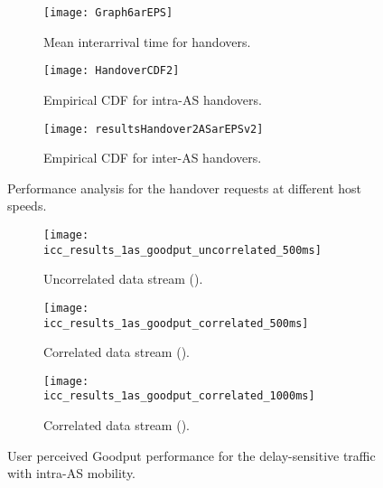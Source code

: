 \documentclass[conference]{IEEEtran}
\begin{document}
\begin{figure*}
        \centering
        \hspace{-0.1in}
        \begin{subfigure}[b]{0.3\textwidth}\centering
               \texttt{[image: Graph6arEPS]}\\
               \caption{Mean interarrival time for handovers.}
               \label{AverageHandoverDuration}
        \end{subfigure}
        \hspace{0.1in}
        \begin{subfigure}[b]{0.3\textwidth}\centering
                \texttt{[image: HandoverCDF2]}\\
                \caption{Empirical CDF for intra-AS handovers.}
                \label{HandoverDistribution}
        \end{subfigure}
        \hspace{0.1in}
        \begin{subfigure}[b]{0.3\textwidth}\centering
                \texttt{[image: resultsHandover2ASarEPSv2]}\\
                \caption{Empirical CDF for inter-AS handovers.}
                \label{HandoverDistribution2AS}
        \end{subfigure}
        \caption{Performance analysis for the handover requests at different host speeds.}\label{fig:handover_analysis}
\end{figure*}

\begin{figure*}
        \centering
        \hspace{-0.15in}
        \begin{subfigure}[b]{0.3\textwidth}\centering
               \texttt{[image: icc\_results\_1as\_goodput\_uncorrelated\_500ms]}\\
               \caption{Uncorrelated data stream ().}
               \label{UncorrelatedGoodput}
        \end{subfigure}
        \hspace{0.05in}
        \begin{subfigure}[b]{0.3\textwidth}\centering
                \texttt{[image: icc\_results\_1as\_goodput\_correlated\_500ms]}\\
                \caption{Correlated data stream ().}
                \label{CorrelatedGoodput250ms}
        \end{subfigure}
        \hspace{0.05in}
        \begin{subfigure}[b]{0.3\textwidth}\centering
                \texttt{[image: icc\_results\_1as\_goodput\_correlated\_1000ms]}\\
                \caption{Correlated data stream ().}
                \label{CorrelatedGoodput1000ms}
        \end{subfigure}
        \caption{User perceived Goodput performance for the delay-sensitive traffic with intra-AS mobility.}\label{fig:delay_sensitive_goodput}
\end{figure*}
\end{document}
